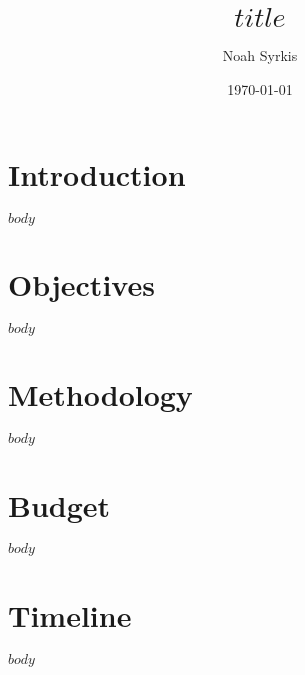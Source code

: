 \documentclass[12pt]{article}
\title{$title$}
\author{Noah Syrkis}
\date{\today}
\begin{document}
\maketitle

\section*{Introduction}
$body$

\section*{Objectives}
$body$

\section*{Methodology}
$body$

\section*{Budget}
$body$

\section*{Timeline}
$body$
\end{document}
